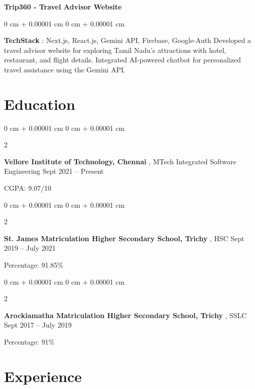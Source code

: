 \documentclass[10pt, letterpaper]{article}
\newenvironment{onecolentry}{
    \begin{adjustwidth}{
        0 cm + 0.00001 cm
    }{
        0 cm + 0.00001 cm
    }
}{
    \end{adjustwidth}
} %
\newenvironment{twocolentry}[2][]{
    \onecolentry
    \def\secondColumn{#2}
    \setcolumnwidth{\fill, 4.5 cm}
    \begin{paracol}{2}
}{
    \switchcolumn \raggedleft \secondColumn
    \end{paracol}
    \endonecolentry
} %
\begin{document}
         \vspace{0.3 cm}
         \begin{samepage}
                \textbf{Trip360 - Travel Advisor Website      }
            \vspace{0.05 cm}
            
            \begin{onecolentry}
               \textbf{TechStack} : Next.js, React.js, Gemini API, Firebase, Google-Auth  
                \vspace{0.05 cm}
               Developed a travel advisor website for exploring Tamil Nadu’s attractions with hotel, restaurant, and flight details. Integrated AI-powered chatbot for personalized travel assistance using the Gemini API.  
        \end{onecolentry}
        \end{samepage}
         \vspace{0.3 cm}
    \section{Education}
        
        \begin{twocolentry}{
            Sept 2021 – Present
        }
            \textbf{Vellore Institute of Technology, Chennai }, MTech Integrated Software Engineering \end{twocolentry}

        \vspace{0.10 cm}
       CGPA: 9.07/10
\vspace{0.10 cm}
\begin{twocolentry}{
            Sept 2019 – July 2021
        }
            \textbf{St. James Matriculation Higher Secondary School, Trichy  }, HSC\end{twocolentry}

        \vspace{0.10 cm}
       Percentage: 91.85\%
       \vspace{0.10 cm}
\begin{twocolentry}{
            Sept 2017 – July 2019
        }
            \textbf{Arockiamatha Matriculation Higher Secondary School, Trichy  }, SSLC\end{twocolentry}

        \vspace{0.10 cm}
       Percentage: 91\%


    
    \section{Experience}
\end{document}
